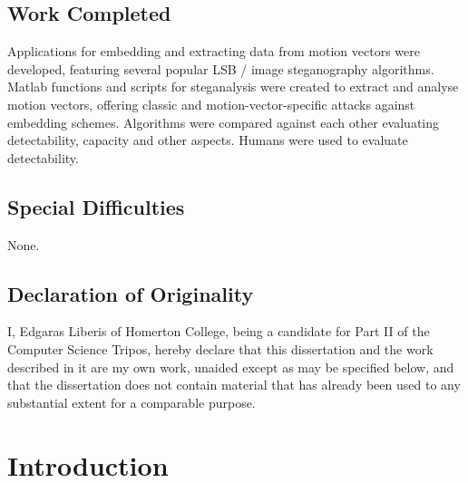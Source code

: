 \documentclass[12pt,british,twoside,notitlepage,usenames,dvipsnames,hypens,final]{report}
\renewcommand\thesubsection{\arabic{subsection}.}
\numberwithin{equation}{section}
\numberwithin{figure}{section}
\newcommand*\circled[1]{\tikz[baseline=(char.base)]{
            \node[shape=circle,draw,inner sep=2pt] (char) {#1};}}
\begin{document}
\section*{Work Completed}

Applications for embedding and extracting data from motion vectors were developed, featuring several popular LSB / image steganography algorithms. Matlab functions and scripts for steganalysis were created to extract and analyse motion vectors, offering classic and motion-vector-specific attacks against embedding schemes. Algorithms were compared against each other evaluating detectability, capacity and other aspects. Humans were used to evaluate detectability.

\section*{Special Difficulties}

None.

\cleardoublepage

\section*{Declaration of Originality}
I, Edgaras Liberis of Homerton College, being a candidate for Part II of the Computer Science Tripos, hereby declare that this dissertation and the work described in it are my own work, unaided except as may be specified below, and that the dissertation does not contain material that has already been used to any substantial extent for a comparable purpose.

\bigskip
{}

\medskip
{}

\newpage
\tableofcontents

\renewcommand{\thesection}{\arabic{chapter}.\arabic{section}}
\renewcommand{\thesubsection}{\arabic{chapter}.\arabic{section}.\arabic{subsection}}
\setcounter{chapter}{1}
\newcommand{\chapterheader}[2]{%
	\cleardoublepage
	\setcounter{chapter}{#1}
	\setcounter{section}{0}
	\chapter*{\scalebox{2}{\circled{#1}} \:\: #2 \hfill}
}
\setcounter{page}{1}
\pagestyle{headings}

\chapterheader{1}{Introduction}
\end{document}
